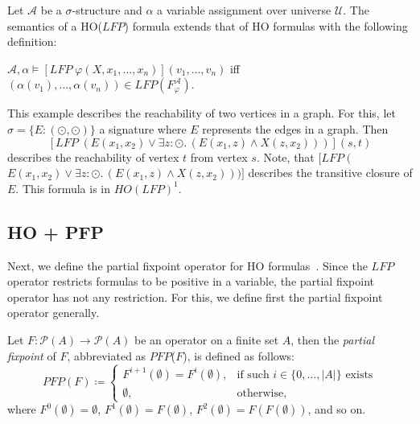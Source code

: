 \begin{definition}
    Let $\mathcal{A}$ be a $\sigma$-structure and $\alpha$ a variable assignment over universe $\mathcal{U}$. The
    semantics of a HO($\mathit{LFP}$) formula extends that of HO formulas with the following definition:
    \begin{compactitem}
        \item $\mathcal{A}, \alpha \models [\mathit{LFP}\;\varphi(X, x_1, \dots, x_n)](v_1, \dots,
        v_n)$ iff $(\alpha(v_1), \dots, \alpha(v_n)) \in \mathit{LFP}(F_\varphi^\mathcal{A})$.
    \end{compactitem}
\end{definition}

\begin{example}{\cite{freireMartins2011descriptive}}
    \label{example:ho_lfp} This example describes the reachability of two
    vertices in a graph. For this, let $\sigma = \{E\colon(\odot, \odot)\}$ a signature where $E$ represents the
    edges in a graph. Then
    \[[LFP\;(E(x_1, x_2) \vee \exists z\colon\odot.\,(E(x_1, z) \wedge X(z, x_2)))](s, t)\]
    describes the reachability of vertex $t$ from vertex $s$. Note, that $[LFP\;($ $E(x_1, x_2) \vee
    \exists z\colon\odot.\,(E(x_1, z) \wedge X(z, x_2)))]$ describes the transitive closure of $E$. This formula is
    in $HO(LFP)^1$.
\end{example}

\subsection{HO + PFP}\label{subsec:ho+Pfp}

Next, we define the partial fixpoint operator for HO formulas~\cite{schewe2006fixpoint}. Since the
$\mathit{LFP}$ operator restricts formulas to be positive in a variable, the partial fixpoint operator has not any
restriction. For this, we define first the partial fixpoint operator generally.

\begin{definition}
    Let $F\colon \mathscr{P}(A) \rightarrow \mathscr{P}(A)$ be an operator on a finite set $A$, then the \emph{partial
    fixpoint} of $F$, abbreviated as $\mathit{PFP}$($F$), is defined as follows:
    \[\mathit{PFP}(F)\coloneqq\begin{cases}
               F^{i+1}(\emptyset)=F^i(\emptyset),  & \text{if such } i \in \{0,\dots,|A|\} \text{ exists}\\
               \emptyset, & \text{otherwise,}
    \end{cases}\]
    where $F^0(\emptyset) = \emptyset$, $F^1(\emptyset) = F(\emptyset)$, $F^2(\emptyset) = F(F(\emptyset))$, and so on.
\end{definition}

